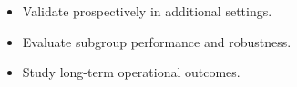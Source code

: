 \begin{itemize}
  \item Validate prospectively in additional settings.
  \item Evaluate subgroup performance and robustness.
  \item Study long-term operational outcomes.
\end{itemize}

